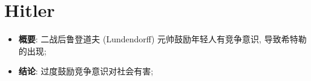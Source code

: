 \section{Hitler}

  \begin{itemize}
    \item \textbf{概要}: 二战后鲁登道夫 (Lundendorff) 元帅鼓励年轻人有竞争意识,
    导致希特勒的出现;
    \item \textbf{结论}: 过度鼓励竞争意识对社会有害;
  \end{itemize}

